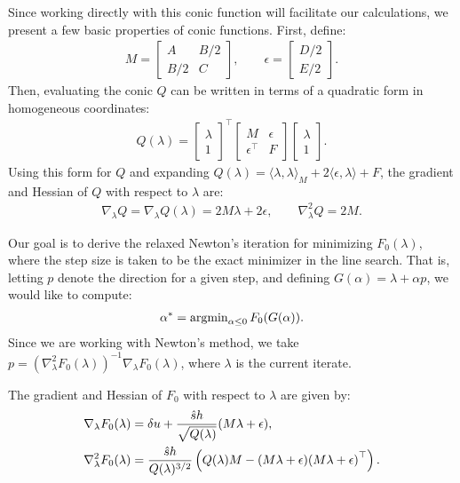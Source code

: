 \documentclass[eikonal.tex]{subfiles}
\begin{document}
Since working directly with this conic function will facilitate our
calculations, we present a few basic properties of conic
functions. First, define:
\begin{align*}
  M = \begin{bmatrix} A & B/2 \\ B/2 & C \end{bmatrix}, \qquad \epsilon = \begin{bmatrix} D/2 \\ E/2 \end{bmatrix}.
\end{align*}
Then, evaluating the conic $Q$ can be written in terms of a quadratic
form in homogeneous coordinates:
\begin{align*}
  Q(\lambda) = \begin{bmatrix} \lambda \\ 1 \end{bmatrix}^\top \begin{bmatrix}
    M & \epsilon \\ \epsilon^\top & F \end{bmatrix} \begin{bmatrix} \lambda \\ 1 \end{bmatrix}.
\end{align*}
Using this form for $Q$ and expanding
$Q(\lambda) = \langle \lambda, \lambda \rangle_M + 2 \langle \epsilon,
\lambda \rangle + F$, the gradient and Hessian of $Q$ with respect to
$\lambda$ are:
\begin{align*}
  \nabla_\lambda Q = \nabla_\lambda Q(\lambda) = 2M\lambda + 2\epsilon, \qquad \nabla_\lambda^2 Q = 2M.
\end{align*}

Our goal is to derive the relaxed Newton's iteration for minimizing
$F_0(\lambda)$, where the step size is taken to be the exact minimizer
in the line search. That is, letting $p$ denote the direction for a
given step, and defining $G(\alpha) = \lambda + \alpha p$, we would
like to compute:
\begin{align*}
  \alpha^* = \operatorname{argmin}_{\alpha \leq 0} F_0(G(\alpha)).
\end{align*}
Since we are working with Newton's method, we take
$p = {(\nabla_\lambda^2F_0(\lambda))}^{-1} \nabla_\lambda F_0(\lambda)$,
where $\lambda$ is the current iterate.

\begin{lemma}
  The gradient and Hessian of $F_0$ with respect to $\lambda$ are given
  by:
  \begin{align*}
    \nabla_\lambda F_0(\lambda) &= \delta u + \frac{\hat{s} h}{\sqrt{Q(\lambda)}} {(M\lambda + \epsilon)}, \\
    \nabla_\lambda^2 F_0(\lambda) &= \frac{\hat{s}h}{Q(\lambda)^{3/2}} \left(Q(\lambda) M - {(M\lambda + \epsilon)}{(M\lambda + \epsilon)}^\top\right).
  \end{align*}
\end{lemma}
\end{document}
